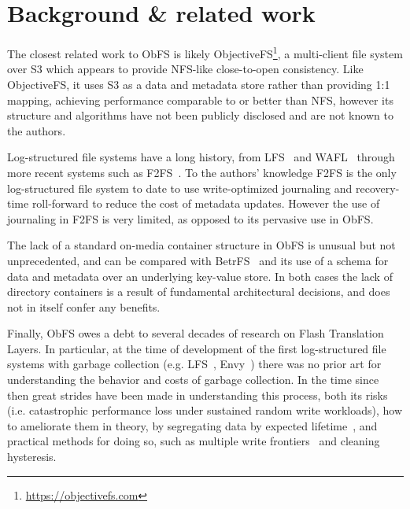 \section{Background \& related work}
\label{sec:background}

The closest related work to ObFS is likely ObjectiveFS\footnote{\url{https://objectivefs.com}}, a multi-client file system over S3 which appears to provide NFS-like close-to-open consistency.
Like ObjectiveFS, it uses S3 as a data and metadata store rather than providing 1:1 mapping, achieving performance comparable to or better than NFS, however its structure and algorithms have not been publicly disclosed and are not known to the authors.

Log-structured file systems have a long history, from LFS~\cite{rosenblum_design_1991} and WAFL~\cite{hitz_file_1994} through more recent systems such as F2FS~\cite{lee_f2fs_2015}.
To the authors' knowledge F2FS is the only log-structured file system to date to use write-optimized journaling and recovery-time roll-forward to reduce the cost of metadata updates.
However the use of journaling in F2FS is very limited, as opposed to its pervasive use in ObFS.

The lack of a standard on-media container structure in ObFS is unusual but not unprecedented, and can be compared with BetrFS~\cite{jannen_betrfs_2015} and its use of a schema for data and metadata over an underlying key-value store.
In both cases the lack of directory containers is a result of fundamental architectural decisions, and does not in itself confer any benefits.

Finally, ObFS owes a debt to several decades of research on Flash Translation Layers.
In particular, at the time of development of the first log-structured file systems with garbage collection (e.g. LFS~\cite{rosenblum_design_1991}, Envy~\cite{wu_envy_1994}) there was no prior art for understanding the behavior and costs of garbage collection.
In the time since then great strides have been made in understanding this process, both its risks (i.e. catastrophic performance loss under sustained random write workloads), how to ameliorate them in theory, by segregating data by expected lifetime~\cite{lee_last_2008}, and practical methods for doing so, such as multiple write frontiers~\cite{lee_f2fs_2015} and cleaning hysteresis.
